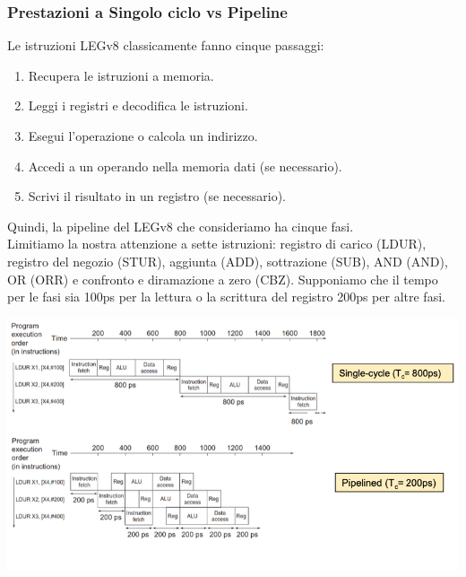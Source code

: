 \documentclass[12pt,a4paper]{article}
\begin{document}
\subsubsection{Prestazioni a Singolo ciclo vs Pipeline}
Le istruzioni LEGv8 classicamente fanno cinque passaggi:
\begin{enumerate}
\item Recupera le istruzioni a memoria.
\item Leggi i registri e decodifica le istruzioni.
\item Esegui l'operazione o calcola un indirizzo.
\item Accedi a un operando nella memoria dati (se necessario).
\item Scrivi il risultato in un registro (se necessario).
\end{enumerate}
Quindi, la pipeline del LEGv8 che consideriamo ha cinque fasi.\\
Limitiamo la nostra attenzione a sette istruzioni: registro di carico (LDUR), registro del negozio (STUR), aggiunta (ADD), sottrazione (SUB), AND (AND), OR (ORR) e confronto e diramazione a zero (CBZ). Supponiamo che il tempo per le fasi sia 100ps per la lettura o la scrittura del registro 200ps per altre fasi.
\begin{center}
\end{center}
\begin{center}
\includegraphics[width=0.6\columnwidth]{img/single_vs_pipeline.png}
\end{center}
\end{document}
